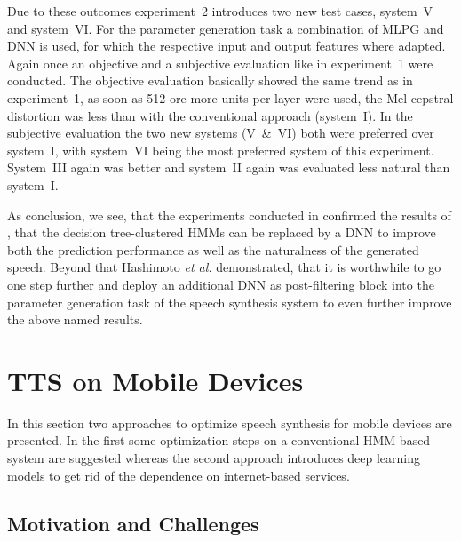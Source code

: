 Due to these outcomes experiment~2 introduces two new test cases, system~V and system~VI. For the parameter generation task a combination of \ac{MLPG} and \ac{DNN} is used, for which the respective input and output features where adapted. Again once an objective and a subjective evaluation like in experiment~1 were conducted. The objective evaluation basically showed the same trend as in experiment~1, as soon as 512 ore more units per layer were used, the Mel-cepstral distortion was less than with the conventional approach (system~I). In the subjective evaluation the two new systems (V~\&~VI) both were preferred over system~I, with system~VI being the most preferred system of this experiment. System~III again was better and system~II again was evaluated less natural than system~I.

As conclusion, we see, that the experiments conducted in \cite{hashimoto:effect} confirmed the results of \cite{zen:deepstatistical}, that the decision tree-clustered \acp{HMM} can be replaced by a \ac{DNN} to improve both the prediction performance as well as the naturalness of the generated speech. Beyond that Hashimoto \textit{et al.} demonstrated, that it is worthwhile to go one step further and deploy an additional \ac{DNN} as post-filtering block into the parameter generation task of the speech synthesis system to even further improve the above named results.


\section{\ac{TTS} on Mobile Devices}
\label{sec:embeddedspeech}

In this section two approaches to optimize speech synthesis for mobile devices are presented. In the first some optimization steps on a conventional \ac{HMM}-based system are suggested \cite{toth:optimizing} whereas the second approach introduces deep learning models to get rid of the dependence on internet-based services.

\subsection{Motivation and Challenges}
\label{subsec:motembedded}


